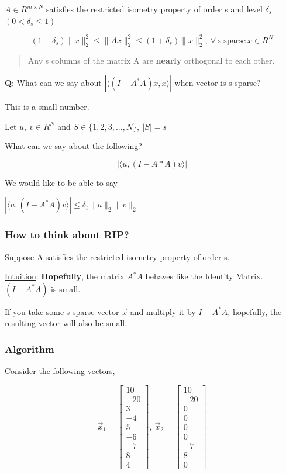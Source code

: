 \documentclass[11pt]{article}
\begin{document}
\(A \in R^{m \times N}\) satisfies the restricted isometry property of order s and
level \(\delta_s\) \((0 < \delta_s \leq 1)\)

$$
(1 - \delta_s) \| x\|_2^2 \leq \| Ax\|_2^2 \leq (1 + \delta_s) \| x\|_2^2, \
\forall \ \text{s-sparse} \ x \in R^N
$$

\begin{quote}
Any s columns of the matrix A are \textbf{nearly} orthogonal to each other.
\end{quote}

\textbf{Q}: What can we say about \(|\langle (I - A^* A)x, x \rangle|\) when vector is
s-sparse?

This is a small number.

Let \(u, \ v \in R^N\) and \(S \in \{1,2,3,...,N\}, \ |S| = s\)

What can we say about the following?

$$|\langle u, (I - A* A)v \rangle|$$

We would like to be able to say

\(|\langle u,(I - A^*A)v \rangle| \leq \delta_t \|u\|_2 \|v\|_2\)

\subsubsection{How to think about RIP?}
\label{sec:orgc32d50a}

Suppose A satisfies the restricted isometry property of order s.

\uline{Intuition}: \textbf{Hopefully}, the matrix \(A^* A\) behaves like the Identity Matrix.
\((I - A^*A)\) is small.

If you take some s-sparse vector \(\vec x\) and multiply it by \(I - A^* A\),
hopefully, the resulting vector will also be small.

\subsubsection{Algorithm}
\label{sec:org7631229}

Consider the following vectors,

$$
\vec x_1 = \begin{bmatrix}
10\\ -20\\ 3\\ -4\\ 5\\ -6\\ -7\\ 8\\ 4
\end{bmatrix}, \ \vec x_2 = \begin{bmatrix}
10\\ -20\\ 0\\ 0\\ 0\\ 0\\ -7\\ 8\\ 0
\end{bmatrix}
$$
\end{document}
